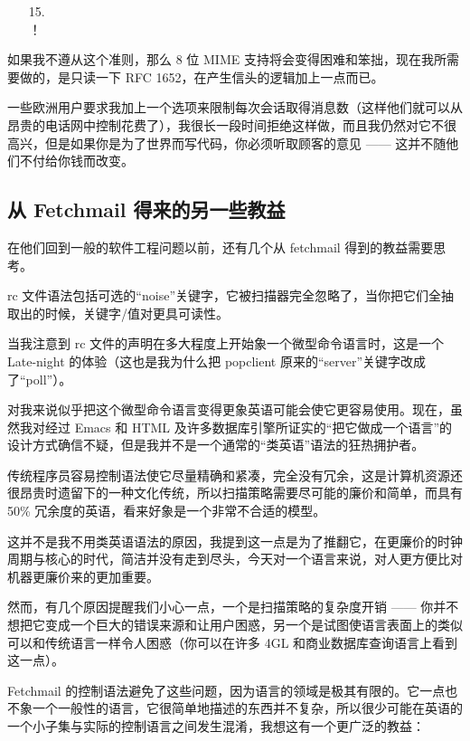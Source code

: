 \begin{enumerate}
\item[15.] \\ ！
\end{enumerate}

如果我不遵从这个准则，那么 8 位 MIME 支持将会变得困难和笨拙，现在我所需要做的，是只读一下 RFC 1652，在产生信头的逻辑加上一点而已。


一些欧洲用户要求我加上一个选项来限制每次会话取得消息数（这样他们就可以从昂贵的电话网中控制花费了），我很长一段时间拒绝这样做，而且我仍然对它不很高兴，但是如果你是为了世界而写代码，你必须听取顾客的意见 —— 这并不随他们不付给你钱而改变。


\subsection{从 Fetchmail 得来的另一些教益}


在他们回到一般的软件工程问题以前，还有几个从 fetchmail 得到的教益需要思考。


rc 文件语法包括可选的“noise”关键字，它被扫描器完全忽略了，当你把它们全抽取出的时候，关键字/值对更具可读性。


当我注意到 rc 文件的声明在多大程度上开始象一个微型命令语言时，这是一个 Late-night 的体验（这也是我为什么把 popclient 原来的“server”关键字改成了“poll”）。


对我来说似乎把这个微型命令语言变得更象英语可能会使它更容易使用。现在，虽然我对经过 Emacs 和 HTML 及许多数据库引擎所证实的“把它做成一个语言”的设计方式确信不疑，但是我并不是一个通常的“类英语”语法的狂热拥护者。


传统程序员容易控制语法使它尽量精确和紧凑，完全没有冗余，这是计算机资源还很昂贵时遗留下的一种文化传统，所以扫描策略需要尽可能的廉价和简单，而具有 50\% 冗余度的英语，看来好象是一个非常不合适的模型。


这并不是我不用类英语语法的原因，我提到这一点是为了推翻它，在更廉价的时钟周期与核心的时代，简洁并没有走到尽头，今天对一个语言来说，对人更方便比对机器更廉价来的更加重要。


然而，有几个原因提醒我们小心一点，一个是扫描策略的复杂度开销 —— 你并不想把它变成一个巨大的错误来源和让用户困惑，另一个是试图使语言表面上的类似可以和传统语言一样令人困惑（你可以在许多 4GL 和商业数据库查询语言上看到这一点）。


Fetchmail 的控制语法避免了这些问题，因为语言的领域是极其有限的。它一点也不象一个一般性的语言，它很简单地描述的东西并不复杂，所以很少可能在英语的一个小子集与实际的控制语言之间发生混淆，我想这有一个更广泛的教益：

